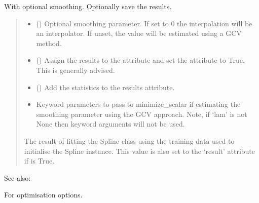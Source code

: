 \documentclass[letterpaper,10pt,english]{sphinxmanual}
\begin{document}
\begin{fulllineitems}
\begin{fulllineitems}
\sphinxAtStartPar
With optional smoothing. Optionally save the results.
\begin{quote}\begin{description}
\begin{itemize}
\item {}
\sphinxAtStartPar
{} () \textendash{} Optional smoothing parameter. If set to 0 the interpolation will be
an  interpolator. If unset, the value will be estimated
using a GCV method.

\item {}
\sphinxAtStartPar
{} () \textendash{} Assign the results to the  attribute and set the 
attribute to True. This is generally advised.

\item {}
\sphinxAtStartPar
{} () \textendash{} Add the statistics to the results attribute.

\item {}
\sphinxAtStartPar
{} \textendash{} Keyword parameters to pass to minimize\_scalar if estimating the
smoothing parameter using the GCV approach. Note, if ‘lam’ is not
None then keyword arguments will not be used.

\end{itemize}

\sphinxAtStartPar
{} \textendash{} The result of fitting the Spline class using the training data used
to initialise the Spline instance. This value is also set to the
‘result’ attribute if  is True.

\sphinxAtStartPar
{}

\end{description}\end{quote}


\begin{sphinxseealso}{See also:}
\begin{description}
\sphinxAtStartPar
For optimisation options.


\end{description}
\end{sphinxseealso}
\end{fulllineitems}
\end{fulllineitems}
\end{document}
